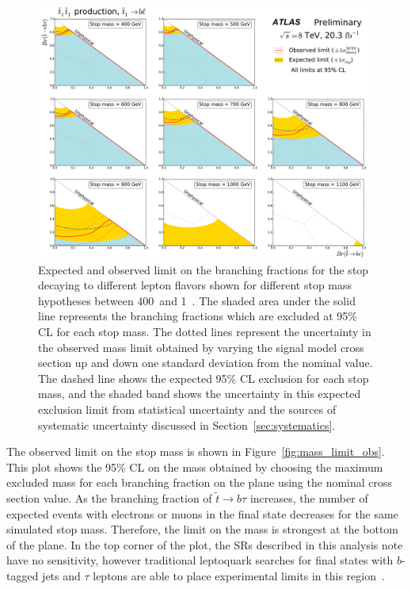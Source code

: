 \begin{figure}[p]
  \centering
  \includegraphics[width=\textwidth]{figs/blstop/limit_contours.pdf}
  \caption{
    Expected and observed limit on the branching fractions for the stop
    decaying to different lepton flavors shown for different stop mass
    hypotheses between 400~\GeV and 1~\TeV. The shaded area under the solid
    line represents the branching fractions which are excluded at 95\% CL
    for each stop mass.
    The dotted lines represent the uncertainty in the observed mass limit
    obtained by varying the signal model cross section up and down one standard
    deviation from the nominal value. The dashed line shows the
    expected 95\% CL exclusion for each stop mass, and the shaded band shows
    the uncertainty in this expected exclusion limit from statistical
    uncertainty and the sources of systematic uncertainty discussed in
    Section~\ref{sec:systematics}.
  }
  \label{fig:limit_contours}
\end{figure}

The observed limit on the stop mass is shown in Figure~\ref{fig:mass_limit_obs}.
This plot shows the 95\% CL on the mass obtained by choosing
the maximum excluded mass for each branching fraction on the plane using the
nominal cross section value.  
As the branching fraction of $\tilde{t} \rightarrow b\tau$ increases, the number of
expected events with electrons or muons in the final state decreases for the
same simulated stop mass.
Therefore, the limit on the mass is strongest at the bottom of the plane.
In the top corner of the plot, the SRs described in this analysis note have no
sensitivity, however traditional leptoquark searches for final states with
$b$-tagged jets and $\tau$ leptons are able to place experimental limits in this
region~\cite{ATLAS:2013oea}.

